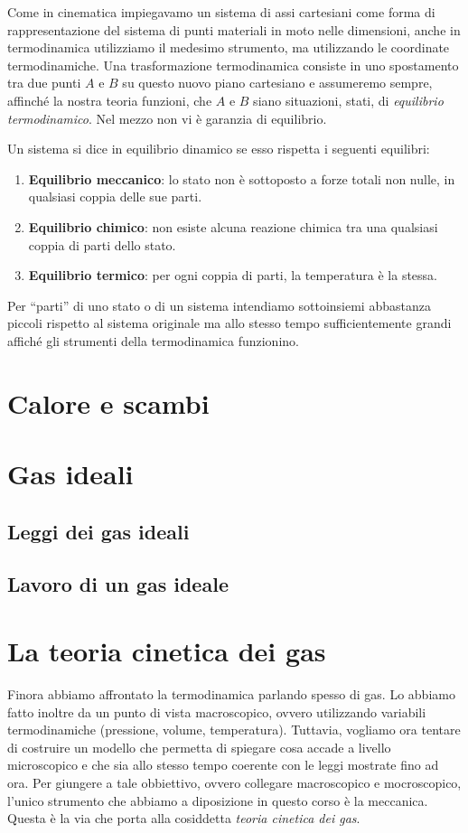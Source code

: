\noindent Come in cinematica impiegavamo un sistema di assi cartesiani come
forma di rappresentazione del sistema di punti materiali in moto nelle dimensioni,
anche in termodinamica utilizziamo il medesimo strumento, ma utilizzando le
coordinate termodinamiche. Una trasformazione termodinamica consiste in uno
spostamento tra due punti $A$ e $B$ su questo nuovo piano cartesiano e assumeremo
sempre, affinché la nostra teoria funzioni, che $A$ e $B$ siano situazioni, stati, di
\textit{equilibrio termodinamico}. Nel mezzo non vi è garanzia di equilibrio.

Un sistema si dice in equilibrio dinamico se esso rispetta i seguenti equilibri:
\begin{enumerate}
    \item \textbf{Equilibrio meccanico}: lo stato non è sottoposto a forze totali non nulle,
    in qualsiasi coppia delle sue parti.

    \item \textbf{Equilibrio chimico}: non esiste alcuna reazione chimica tra una qualsiasi
    coppia di parti dello stato.

    \item \textbf{Equilibrio termico}: per ogni coppia di parti, la temperatura è la stessa.
\end{enumerate}

\noindent Per ``parti'' di uno stato o di un sistema intendiamo sottoinsiemi
abbastanza piccoli rispetto al sistema originale ma allo stesso tempo sufficientemente
grandi affiché gli strumenti della termodinamica funzionino.

\section*{Calore e scambi}
\section*{Gas ideali}
\subsection*{Leggi dei gas ideali}
\subsection*{Lavoro di un gas ideale}

\section*{La teoria cinetica dei gas}
Finora abbiamo affrontato la termodinamica parlando spesso di gas.
Lo abbiamo fatto inoltre da un punto di vista macroscopico, ovvero
utilizzando variabili termodinamiche (pressione, volume, temperatura).
Tuttavia, vogliamo ora tentare di costruire un modello che permetta
di spiegare cosa accade a livello microscopico e che sia allo stesso
tempo coerente con le leggi mostrate fino ad ora.
Per giungere a tale obbiettivo, ovvero collegare macroscopico e mocroscopico,
l'unico strumento che abbiamo a diposizione in questo corso è la meccanica.
Questa è la via che porta alla cosiddetta \textit{teoria cinetica dei
gas}.

